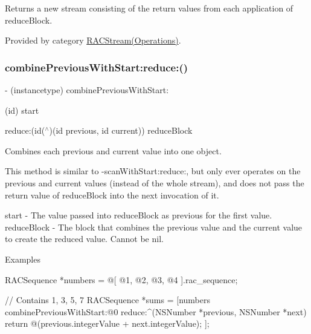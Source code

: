 Returns a new stream consisting of the return values from each application of {\ttfamily reduce\+Block}. 

Provided by category \mbox{\hyperlink{category_r_a_c_stream_07_operations_08_a698f6ef68be8d3cb34f9be6efaaa5af7}{R\+A\+C\+Stream(\+Operations)}}.

\mbox{\label{interface_r_a_c_stream_a698f6ef68be8d3cb34f9be6efaaa5af7}} 
\subsubsection{\texorpdfstring{combine\+Previous\+With\+Start\+:reduce\+:()}{combinePreviousWithStart:reduce:()}\hspace{0.1cm}{\footnotesize\ttfamily [3/3]}}
{\footnotesize\ttfamily -\/ (instancetype) combine\+Previous\+With\+Start\+: \begin{DoxyParamCaption}\item[{(id)}]{start }\item[{reduce:(id($^\wedge$)(id previous, id current))}]{reduce\+Block }\end{DoxyParamCaption}}

Combines each previous and current value into one object.

This method is similar to -\/scan\+With\+Start\+:reduce\+:, but only ever operates on the previous and current values (instead of the whole stream), and does not pass the return value of {\ttfamily reduce\+Block} into the next invocation of it.

start -\/ The value passed into {\ttfamily reduce\+Block} as {\ttfamily previous} for the first value. reduce\+Block -\/ The block that combines the previous value and the current value to create the reduced value. Cannot be nil.

Examples \begin{DoxyVerb} RACSequence *numbers = @[ @1, @2, @3, @4 ].rac_sequence;

 // Contains 1, 3, 5, 7
 RACSequence *sums = [numbers combinePreviousWithStart:@0 reduce:^(NSNumber *previous, NSNumber *next) {
     return @(previous.integerValue + next.integerValue);
 }];
\end{DoxyVerb}


